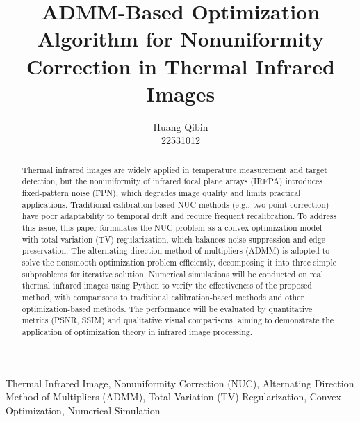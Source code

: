 \documentclass[11pt,onecolumn]{IEEEtran}
\title{ADMM-Based Optimization Algorithm for Nonuniformity Correction in Thermal Infrared Images}
\author{Huang Qibin\\22531012}
\begin{document}
\maketitle

\begin{abstract}
Thermal infrared images are widely applied in temperature measurement and target detection, but the nonuniformity of infrared focal plane arrays (IRFPA) introduces fixed-pattern noise (FPN), which degrades image quality and limits practical applications. Traditional calibration-based NUC methods (e.g., two-point correction) have poor adaptability to temporal drift and require frequent recalibration. To address this issue, this paper formulates the NUC problem as a convex optimization model with total variation (TV) regularization, which balances noise suppression and edge preservation. The alternating direction method of multipliers (ADMM) is adopted to solve the nonsmooth optimization problem efficiently, decomposing it into three simple subproblems for iterative solution. Numerical simulations will be conducted on real thermal infrared images using Python to verify the effectiveness of the proposed method, with comparisons to traditional calibration-based methods and other optimization-based methods. The performance will be evaluated by quantitative metrics (PSNR, SSIM) and qualitative visual comparisons, aiming to demonstrate the application of optimization theory in infrared image processing.
\end{abstract}

\renewcommand{\IEEEkeywordsname}{Keywords}
\begin{IEEEkeywords}
Thermal Infrared Image, Nonuniformity Correction (NUC), Alternating Direction Method of Multipliers (ADMM), Total Variation (TV) Regularization, Convex Optimization, Numerical Simulation
\end{IEEEkeywords}
\end{document}

